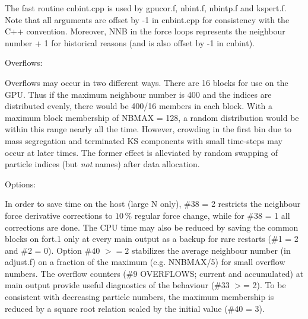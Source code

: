 \documentclass[12pt]{article}
\begin{document}
\medskip
The fast routine cnbint.cpp is used by gpucor.f, nbint.f, nbintp.f and kspert.f.
Note that all arguments are offset by -1 in cnbint.cpp for consistency with
the C++ convention.
Moreover, NNB in the force loops represents the neighbour number + 1 for
historical reasons (and is also offset by -1 in cnbint).

\medskip
\medskip
\noindent
Overflows:

\medskip
Overflows may occur in two different ways.
There are 16 blocks for use on the GPU.
Thus if the maximum neighbour number is 400 and the indices are
distributed evenly, there would be 400/16 members in each block.
With a maximum block membership of NBMAX = 128, a random distribution
would be within this range nearly all the time.
However, crowding in the first bin due to mass segregation and
terminated KS components with small time-steps may occur at later times.
The former effect is alleviated by random swapping of particle indices
(but {\it not} names) after data allocation.

\medskip
\medskip
\noindent
Options:

\medskip
In order to save time on the host (large N only), \#38 = 2 restricts the
neighbour force derivative corrections to $10 \,\%$ regular force change,
while for \#38 = 1 all corrections are done.
The CPU time may also be reduced by saving the common blocks on fort.1
only at every main output as a backup for rare restarts (\#1 = 2 and \#2 = 0).
Option \#40 $>= 2$ stabilizes the average neighbour number (in adjust.f)
on a fraction of the maximum (e.g. NNBMAX/5) for small overflow numbers.
The overflow counters (\#9 OVERFLOWS; current and accumulated) at main
output provide useful diagnostics of the behaviour (\#33 $>$= 2).
To be consistent with decreasing particle numbers, the maximum membership
is reduced by a square root relation scaled by the initial value (\#40 = 3).
\end{document}
